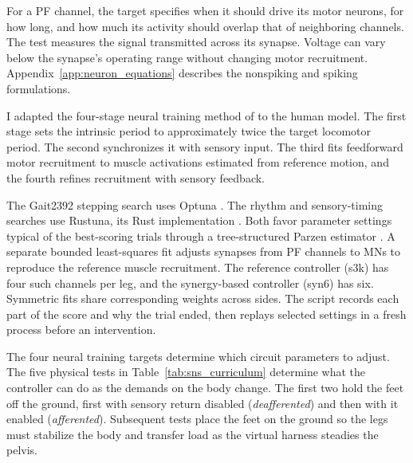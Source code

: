 For a PF channel, the target specifies when it should drive its motor neurons, for how long, and how much its activity should overlap that of neighboring channels. The test measures the signal transmitted across its synapse. Voltage can vary below the synapse's operating range without changing motor recruitment. Appendix~\ref{app:neuron_equations} describes the nonspiking and spiking formulations.

I adapted the four-stage neural training method of \citet{hunt_development_2017} to the human model. The first stage sets the intrinsic period to approximately twice the target locomotor period. The second synchronizes it with sensory input. The third fits feedforward motor recruitment to muscle activations estimated from reference motion, and the fourth refines recruitment with sensory feedback.

The Gait2392 stepping search uses Optuna \citep{akiba_optuna_2019}. The rhythm and sensory-timing searches use Rustuna, its Rust implementation \citep{optuna_rustuna_2026}. Both favor parameter settings typical of the best-scoring trials through a tree-structured Parzen estimator \citep{bergstra_algorithms_2011}. A separate bounded least-squares fit adjusts synapses from PF channels to MNs to reproduce the reference muscle recruitment. The reference controller (s3k) has four such channels per leg, and the synergy-based controller (syn6) has six. Symmetric fits share corresponding weights across sides. The script records each part of the score and why the trial ended, then replays selected settings in a fresh process before an intervention.

The four neural training targets determine which circuit parameters to adjust. The five physical tests in Table~\ref{tab:sns_curriculum} determine what the controller can do as the demands on the body change. The first two hold the feet off the ground, first with sensory return disabled (\emph{deafferented}) and then with it enabled (\emph{afferented}). Subsequent tests place the feet on the ground so the legs must stabilize the body and transfer load as the virtual harness steadies the pelvis.

